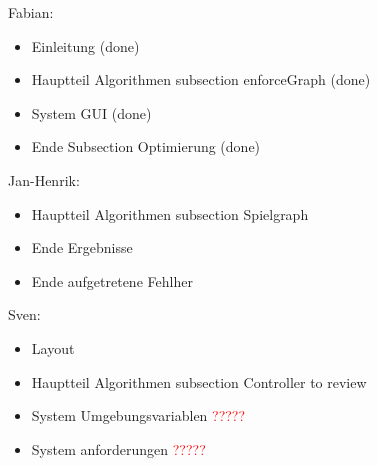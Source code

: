 Fabian:
\begin{itemize}
	\item Einleitung (done)
	\item Hauptteil Algorithmen subsection enforceGraph (done)
	\item System GUI (done)
	\item Ende Subsection Optimierung (done)
\end{itemize}
Jan-Henrik:
\begin{itemize}
	\item Hauptteil Algorithmen subsection Spielgraph
	\item Ende Ergebnisse
	\item Ende aufgetretene Fehlher
\end{itemize}
Sven:
\begin{itemize}
	\item Layout
	\item Hauptteil Algorithmen subsection Controller to review
	\item System Umgebungsvariablen \textcolor{red}{?????}
	\item System anforderungen \textcolor{red}{?????}
\end{itemize}

